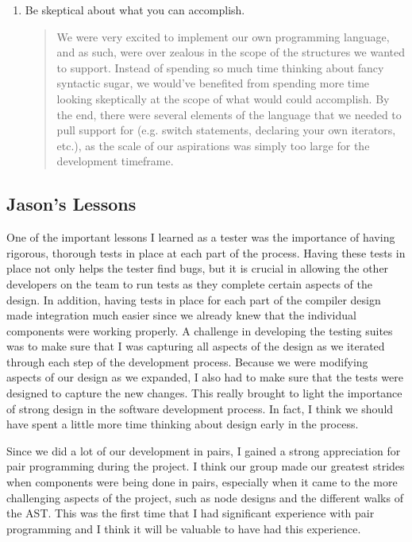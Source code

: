 \documentclass{report}
\begin{document}
\begin{enumerate}
\begin{quotation}
\end{quotation}
\item Be skeptical about what you can accomplish.
\begin{quotation}
\noindent We were very excited to implement our own programming language, and as such, were
over zealous in the scope of the structures we wanted to support. Instead of spending so
much time thinking about fancy syntactic sugar, we would've benefited from spending more time
looking skeptically at the scope of what would could accomplish. By the end, there were several elements of the language that we needed to pull support for (e.g. switch statements, declaring your own iterators, etc.), as the scale of our aspirations was simply too large for the 
development timeframe.
\end{quotation}
\end{enumerate}

\subsection{Jason's Lessons}
\label{sub:jasons-lessons}

One of the important lessons I learned as a tester was the importance of having rigorous, thorough tests in place at each part of the process. Having these tests in place not only helps the tester find bugs, but it is crucial in allowing the other developers on the team to run tests as they complete certain aspects of the design. In addition, having tests in place for each part of the compiler design made integration much easier since we already knew that the individual components were working properly. A challenge in developing the testing suites was to make sure that I was capturing all aspects of the design as we iterated through each step of the development process. Because we were modifying aspects of our design as we expanded, I also had to make sure that the tests were designed to capture the new changes.  This really brought to light the importance of strong design in the software development process. In fact, I think we should have spent a little more time thinking about design early in the process.

Since we did a lot of our development in pairs, I gained a strong appreciation for pair programming during the project. I think our group made our greatest strides when components were being done in pairs, especially when it came to the more challenging aspects of the project, such as node designs and the different walks of the AST. This was the first time that I had significant experience with pair programming and I think it will be valuable to have had this experience.
\end{document}
